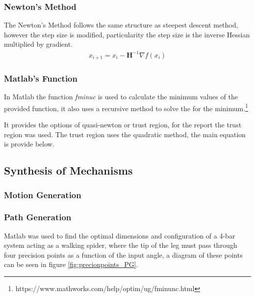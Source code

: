 \documentclass[12pt]{article}
\begin{document}
\subsubsection{Newton's Method}
The Newton’s Method follows the same structure as steepest descent method, however the step size is modified, particularity  the step size is the inverse Hessian multiplied by gradient.
\begin{align}
    x_{i+1}=x_i-\textbf{H}^{-1}\nabla f(x_i)
\end{align}

\subsubsection{Matlab's Function}
In Matlab the function \textit{fminuc} is used to calculate the minimum values of the provided function, it also uses a recursive method to solve the for the minimum.\footnote{https://www.mathworks.com/help/optim/ug/fminunc.html}

It provides the options of quasi-newton or trust region, for the report the trust region was used. 
The trust region uses the quadratic method, the main equation is provide below. 
\pagebreak
\subsection{Synthesis of Mechanisms}
\subsubsection{Motion Generation}
\subsubsection{Path Generation}
Matlab was used to find the optimal dimensions and configuration of a 4-bar system acting as a walking spider, where the tip of the leg must pass through four precision points as a function of the input angle, a diagram of these points can be seen in figure \ref{fig:precionpoints_PG}.
\end{document}
